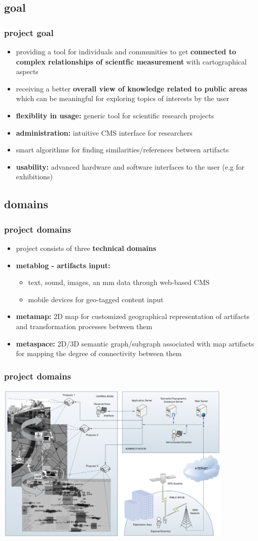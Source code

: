 \documentclass[blue]{beamer}
\begin{document}
\subsection{goal}
\frame
{
\frametitle{\textbf{project goal}}
\begin{itemize}
\item providing a tool for individuals and communities to get \textbf{connected to complex relationships of scientfic measurement} with cartographical aspects
\item receiving a better \textbf{overall view of knowledge related to public areas} which can be meaningful for exploring topics of interests by the user
\item \textbf{flexiblity in usage:} generic tool for scientific research projects
\item \textbf{administration:} intuitive CMS interface for researchers
\item smart algorithms for finding similarities/references between artifacts
\item \textbf{usability:} advanced hardware and software interfaces to the user (e.g for exhibitions)
\end{itemize}
}


\subsection{domains}
\frame
{
\frametitle{\textbf{project domains}}
\begin{itemize}
\item project consists of three \textbf{technical domains} 
\item \textbf{metablog - artifacts input:}
  \begin{itemize}
    \item text, sound, images, an mm data through web-based CMS
    \item mobile devices for geo-tagged content input
  \end{itemize}
\item \textbf{metamap:} 2D map for customized geographical representation of artifacts and transformation processes between them
\item \textbf{metaspace:} 2D/3D semantic graph/subgraph associated with map artifacts for mapping the degree of connectivity between them
\end{itemize}
}

\frame
{
\frametitle{\textbf{project domains}}
\includegraphics[width=0.85\textwidth]{bin/domains/domains.png}
}
\end{document}
